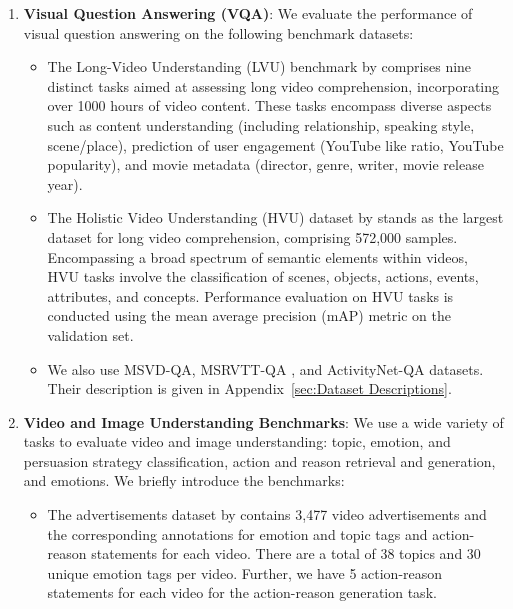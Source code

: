 \begin{enumerate}[wide]
    \item \textbf{Visual Question Answering (VQA)}: We evaluate the performance of visual question answering on the following benchmark datasets:

    \begin{itemize}
         
        \item The Long-Video Understanding (LVU) benchmark by \citet{wu2021towards} comprises nine distinct tasks aimed at assessing long video comprehension, incorporating over 1000 hours of video content. These tasks encompass diverse aspects such as content understanding (including relationship, speaking style, scene/place), prediction of user engagement (YouTube like ratio, YouTube popularity), and movie metadata (director, genre, writer, movie release year). %
    
        \item The Holistic Video Understanding (HVU) dataset by \citet{diba2020large} stands as the largest dataset for long video comprehension, comprising 572,000 samples. Encompassing a broad spectrum of semantic elements within videos, HVU tasks involve the classification of scenes, objects, actions, events, attributes, and concepts. Performance evaluation on HVU tasks is conducted using the mean average precision (mAP) metric on the validation set.

        \item We also use MSVD-QA, MSRVTT-QA \cite{chen2011collecting,xu2016msr}, and ActivityNet-QA \cite{caba2015activitynet} datasets. Their description is given in Appendix~\ref{sec:Dataset Descriptions}. 
        
    \end{itemize}
   

    \item \textbf{Video and Image Understanding Benchmarks}: We use a wide variety of tasks to evaluate video and image understanding: topic, emotion, and persuasion strategy classification, action and reason retrieval and generation, and emotions. We briefly introduce the benchmarks:
    
        \begin{itemize}
            \item The advertisements dataset by \citet{hussain2017automatic} contains 3,477 video advertisements and the corresponding annotations for emotion and topic tags and action-reason statements for each video. There are a total of 38 topics and 30 unique emotion tags per video. Further, we have 5 action-reason statements for each video for the action-reason generation task. %


\end{itemize}
\end{enumerate}
